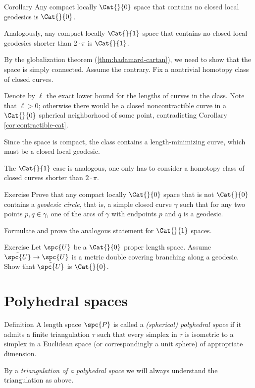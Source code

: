 \begin{thm}{Corollary}\label{cor:closed-geod-cat} 
Any compact locally $\Cat{}{0}$ space that contains no closed local geodesics is $\Cat{}{0}$.
 
Analogously, any compact locally $\Cat{}{1}$ space that  contains no closed local geodesics shorter than $2\cdot\pi$ is $\Cat{}{1}$.
\end{thm}

By the globalization theorem (\ref{thm:hadamard-cartan}), we need to show that the space is simply connected.
Assume the contrary. 
Fix a nontrivial homotopy class of closed curves.

Denote by $\ell$ the exact lower bound for the lengths of curves in the class.
Note that $\ell>0$;
otherwise there would be a closed noncontractible curve in a $\Cat{}{0}$ spherical neighborhood of some point, contradicting Corollary \ref{cor:contractible-cat}.

Since the space is compact, the class contains a length-minimizing curve, 
which must be a closed local geodesic. 

The $\Cat{}{1}$ case is analogous, one only has to consider a homotopy class of closed curves shorter than $2\cdot\pi$.
\qeds

\begin{thm}{Exercise}\label{ex:geod-circle}
Prove that any compact locally $\Cat{}{0}$ space that is not $\Cat{}{0}$ contains a \emph{geodesic circle}, 
that is, a simple closed curve $\gamma$ such that 
for any two points $p,q\in\gamma$, one of the arcs of $\gamma$ with endpoints $p$ and $q$ is a  geodesic.

Formulate and prove the analogous statement for $\Cat{}{1}$ spaces.
\end{thm}

\begin{thm}{Exercise}\label{ex:branching-cover} 
Let $\spc{U}$ be a $\Cat{}{0}$ proper length space.
Assume $\tilde{\spc{U}}\to \spc{U}$ is a metric  double covering branching along a geodesic.
Show that $\tilde{\spc{U}}$ is $\Cat{}{0}$.
\end{thm}

\section{Polyhedral spaces}

\begin{thm}{Definition}\label{def:poly}
A length space $\spc{P}$ is called  
a \emph{(spherical) polyhedral space} 
if it admits a finite triangulation $\tau$ 
such that every simplex in $\tau$ is isometric to a simplex in a Euclidean space (or correspondingly a unit sphere) of appropriate dimension.

By a 
\emph{triangulation of a polyhedral space} 
we will always understand the triangulation as above. 
\end{thm}

